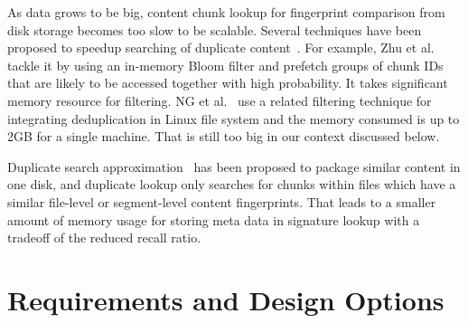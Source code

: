 As data grows to be big, content chunk lookup for fingerprint comparison from disk storage
becomes too slow to be scalable.
Several techniques have been proposed to speedup searching of duplicate 
content~\cite{bottleneck08,extreme_binning09,sparseindex09}. For example,  
Zhu et al.~\cite{bottleneck08} tackle it 
by using an in-memory Bloom filter and prefetch groups of chunk IDs that are likely to be 
accessed together with high probability. It takes significant memory resource for filtering.
NG et al.~\cite{ NGmiddleware2011}  use  
a related filtering technique for integrating deduplication in Linux  file system and the memory
consumed is up to 2GB for a single machine. That is still too big in our context discussed below. 

Duplicate  search approximation~\cite{extreme_binning09,sparseindex09}  has been proposed 
to package similar content in one disk, and duplicate lookup  only searches
for chunks within files which have a similar file-level or segment-level  content fingerprints.
That leads  to a smaller amount of memory usage for storing meta data in signature
lookup with a tradeoff of the reduced recall ratio. 

\section{Requirements and Design Options}
\label{sect:options}

